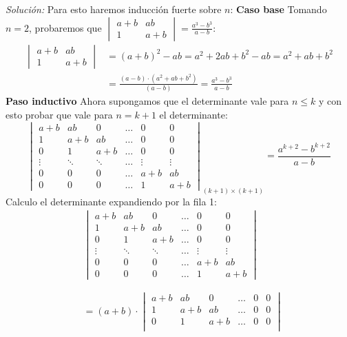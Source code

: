 \documentclass{article}
\newenvironment{solution}
    {\textit{Solución:}}
    {}
\begin{document}
\begin{solution}
    Para esto haremos inducción fuerte sobre $n$:
    \textbf{Caso base}
    Tomando $n=2$, probaremos que $\begin{vmatrix} a+b & ab \\ 1 &  a+b \end{vmatrix} =  \frac{a^3-b^3}{a-b}$:
    $$
    \begin{aligned}
    \begin{vmatrix} a+b & ab \\ 1 &  a+b \end{vmatrix} &= (a+b)^2 - ab = a^2 +2ab + b^2 - ab = a^2 + ab + b^2 \\
    &= \frac{(a-b)\cdot (a^2 + ab + b^2)}{(a-b)} = \frac{a^3-b^3}{a-b}
    \end{aligned}
    $$
    \textbf{Paso inductivo}
Ahora supongamos que el determinante vale para $n\leq k$ y con esto probar que vale para $n=k+1$ el determinante:
\[
\begin{vmatrix}
a+ b & ab & 0 & \dots & 0 & 0 \\
1 & a+b & ab & \dots & 0 & 0 \\
0 & 1 & a+b & \dots & 0 & 0 \\
\vdots & \ddots & \ddots & \dots & \vdots & \vdots \\
0 & 0 & 0 & \dots & a+b & ab \\
0 & 0 & 0 & \dots & 1 & a+b
\end{vmatrix}_{(k+1)\times(k+1)} =
\frac{a^{k+2}-b^{k+2}}{a-b}
\]
Calculo el determinante expandiendo por la fila 1:
\[
\begin{aligned}
& \begin{vmatrix}
a+ b & ab & 0 & \dots & 0 & 0 \\
1 & a+b & ab & \dots & 0 & 0 \\
0 & 1 & a+b & \dots & 0 & 0 \\
\vdots & \ddots & \ddots & \dots & \vdots & \vdots \\
0 & 0 & 0 & \dots & a+b & ab \\
0 & 0 & 0 & \dots & 1 & a+b
\end{vmatrix} \\ \\ \\
&= (a+b) \cdot
\begin{vmatrix}
a+ b & ab & 0 & \dots & 0 & 0 \\
1 & a+b & ab & \dots & 0 & 0 \\
0 & 1 & a+b & \dots & 0 & 0 \\

\end{vmatrix}
\end{aligned}\]
\end{solution}
\end{document}
